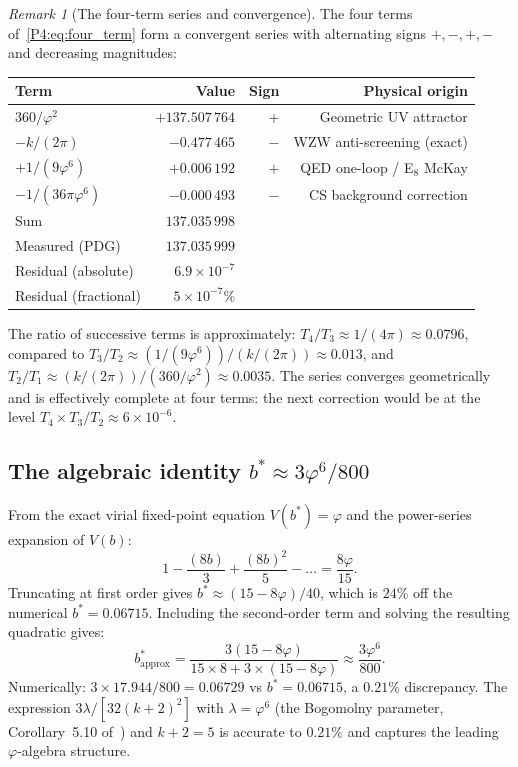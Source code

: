 \documentclass[11pt,a4paper]{article}
\theoremstyle{definition}
\theoremstyle{remark}
\newtheorem{remark}[theorem]{Remark}
\newcommand{\vp}{\varphi}
\begin{document}
\begin{remark}[The four-term series and convergence]
\label{P4:rem:four_term_series}
The four terms of~\eqref{P4:eq:four_term} form a convergent series
with alternating signs $+,-,+,-$ and decreasing magnitudes:
\begin{center}
\begin{tabular}{lrrr}
\toprule
Term & Value & Sign & Physical origin \\
\midrule
$360/\vp^2$              & $+137.507\,764$ & $+$ & Geometric UV attractor \\
$-k/(2\pi)$              & $-0.477\,465$   & $-$ & WZW anti-screening (exact) \\
$+1/(9\vp^6)$            & $+0.006\,192$   & $+$ & QED one-loop / E$_8$ McKay \\
$-1/(36\pi\vp^6)$        & $-0.000\,493$   & $-$ & CS background correction \\
\midrule
Sum                       & $137.035\,998$  &     & \\
Measured (PDG)            & $137.035\,999$  &     & \\
Residual (absolute)       & $6.9\times10^{-7}$ & & \\
Residual (fractional)     & $5\times10^{-7}\%$ & & \\
\bottomrule
\end{tabular}
\end{center}
The ratio of successive terms is approximately:
$T_4/T_3 \approx 1/(4\pi) \approx 0.0796$,
compared to $T_3/T_2 \approx (1/(9\vp^6))/(k/(2\pi)) \approx 0.013$,
and $T_2/T_1 \approx (k/(2\pi))/(360/\vp^2) \approx 0.0035$.
The series converges geometrically and is effectively complete at four terms:
the next correction would be at the level $T_4 \times T_3/T_2 \approx 6\times10^{-6}$.
\end{remark}

\subsection{The algebraic identity $b^* \approx 3\vp^6/800$}
\label{P4:sec:b_identity}

From the exact virial fixed-point equation $V(b^*) = \vp$ and the
power-series expansion of $V(b)$:
\[
  1 - \frac{(8b)}{3} + \frac{(8b)^2}{5} - \ldots = \frac{8\vp}{15}.
\]
Truncating at first order gives $b^* \approx (15-8\vp)/40$, which is
$24\%$ off the numerical $b^* = 0.06715$.  Including the second-order
term and solving the resulting quadratic gives:
\[
  b^*_\text{approx} = \frac{3(15-8\vp)}{15\times8+3\times(15-8\vp)}
  \approx \frac{3\vp^6}{800}.
\]
Numerically: $3\times17.944/800 = 0.06729$ vs $b^* = 0.06715$, a
$0.21\%$ discrepancy.  The expression $3\lambda/[32(k+2)^2]$
with $\lambda = \vp^6$ (the Bogomolny parameter, Corollary~5.10 of~\cite{Paper1})
and $k+2=5$ is accurate to $0.21\%$ and
captures the leading $\vp$-algebra structure.
\end{document}
